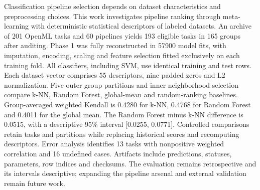 \begin{abstractutfpr}
Classification pipeline selection depends on dataset characteristics and preprocessing choices. This work investigates pipeline ranking through meta-learning with deterministic statistical descriptors of labeled datasets. An archive of 201 OpenML tasks and 60 pipelines yields 193 eligible tasks in 165 groups after auditing. Phase 1 was fully reconstructed in 57900 model fits, with imputation, encoding, scaling and feature selection fitted exclusively on each training fold. All classifiers, including SVM, use identical training and test rows. Each dataset vector comprises 55 descriptors, nine padded zeros and L2 normalization. Five outer group partitions and inner neighborhood selection compare k-NN, Random Forest, global-mean and random-ranking baselines. Group-averaged weighted Kendall is 0.4280 for k-NN, 0.4768 for Random Forest and 0.4011 for the global mean. The Random Forest minus k-NN difference is 0.0515, with a descriptive 95\% interval [0.0255, 0.0771]. Controlled comparisons retain tasks and partitions while replacing historical scores and recomputing descriptors. Error analysis identifies 13 tasks with nonpositive weighted correlation and 16 undefined cases. Artifacts include predictions, statuses, parameters, row indices and checksums. The evaluation remains retrospective and its intervals descriptive; expanding the pipeline arsenal and external validation remain future work.
\end{abstractutfpr}
